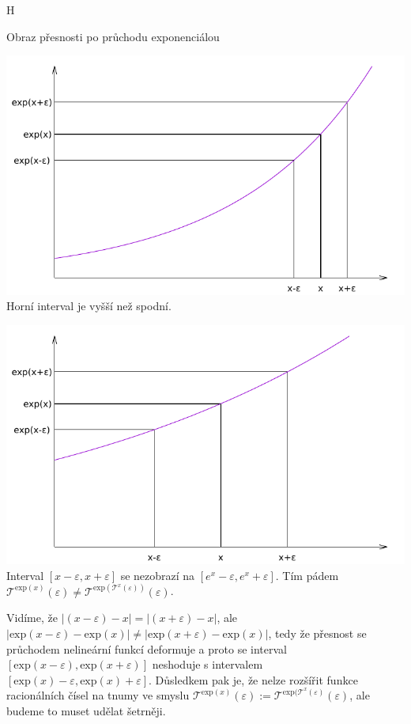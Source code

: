 \begin{myfigure}{H}
\caption{Obraz přesnosti po průchodu exponenciálou}
\includegraphics[width=\linewidth]{graphics/exp1.pdf}\label{fig:exp1}
Horní interval je vyšší než spodní.

\includegraphics[width=\linewidth]{graphics/exp4.pdf}\label{fig:exp4}
Interval $[x-\varepsilon,x+\varepsilon]$ se nezobrazí na $[e^x-\varepsilon,e^x+\varepsilon]$. Tím pádem $\mathcal{T}^{\mathrm{exp}(x)}(\varepsilon) \neq \mathcal{T}^{\mathrm{exp}(\mathcal{T}^x(\varepsilon))}(\varepsilon)$.
\end{myfigure}

Vidíme, že $|(x-\varepsilon)-x|=|(x+\varepsilon)-x|$, ale $|\mathrm{exp}(x-\varepsilon)-\mathrm{exp}(x)|\neq|\mathrm{exp}(x+\varepsilon)-\mathrm{exp}(x)|$, tedy že přesnost se průchodem nelineární funkcí deformuje a proto se interval $[\mathrm{exp}(x-\varepsilon),\mathrm{exp}(x+\varepsilon)]$ neshoduje s intervalem $[\mathrm{exp}(x)-\varepsilon,\mathrm{exp}(x)+\varepsilon]$. Důsledkem pak je, že nelze rozšířit funkce racionálních čísel na tnumy ve smyslu $\mathcal{T}^{\mathrm{exp}(x)}(\varepsilon) := \mathcal{T}^{\mathrm{exp}(\mathcal{T}^x(\varepsilon)}(\varepsilon)$, ale budeme to muset udělat šetrněji.

